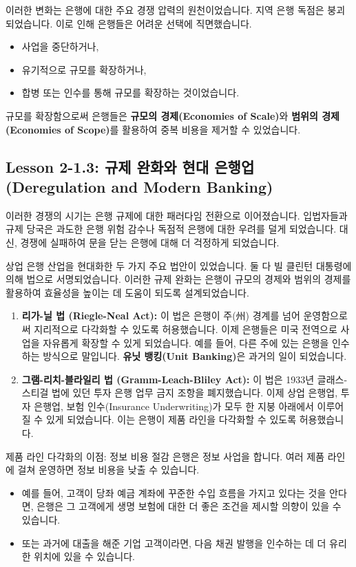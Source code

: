 \documentclass[11pt,a4paper]{article}
\begin{document}
이러한 변화는 은행에 대한 주요 경쟁 압력의 원천이었습니다. 지역 은행 독점은 붕괴되었습니다. 이로 인해 은행들은 어려운 선택에 직면했습니다.
\begin{itemize}
    \item 사업을 중단하거나,
    \item 유기적으로 규모를 확장하거나,
    \item 합병 또는 인수를 통해 규모를 확장하는 것이었습니다.
\end{itemize}
규모를 확장함으로써 은행들은 \textbf{규모의 경제(Economies of Scale)}와 \textbf{범위의 경제(Economies of Scope)}를 활용하여 중복 비용을 제거할 수 있었습니다.

\newpage
\subsection{Lesson 2-1.3: 규제 완화와 현대 은행업 (Deregulation and Modern Banking)}

이러한 경쟁의 시기는 은행 규제에 대한 패러다임 전환으로 이어졌습니다. 입법자들과 규제 당국은 과도한 은행 위험 감수나 독점적 은행에 대한 우려를 덜게 되었습니다. 대신, 경쟁에 실패하여 문을 닫는 은행에 대해 더 걱정하게 되었습니다.

상업 은행 산업을 현대화한 두 가지 주요 법안이 있었습니다. 둘 다 빌 클린턴 대통령에 의해 법으로 서명되었습니다. 이러한 규제 완화는 은행이 규모의 경제와 범위의 경제를 활용하여 효율성을 높이는 데 도움이 되도록 설계되었습니다.

\begin{enumerate}
    \item \textbf{리가-닐 법 (Riegle-Neal Act):}
    이 법은 은행이 주(州) 경계를 넘어 운영함으로써 지리적으로 다각화할 수 있도록 허용했습니다. 이제 은행들은 미국 전역으로 사업을 자유롭게 확장할 수 있게 되었습니다. 예를 들어, 다른 주에 있는 은행을 인수하는 방식으로 말입니다. \textbf{유닛 뱅킹(Unit Banking)}은 과거의 일이 되었습니다.

    \item \textbf{그램-리치-블라일리 법 (Gramm-Leach-Bliley Act):}
    이 법은 1933년 글래스-스티걸 법에 있던 투자 은행 업무 금지 조항을 폐지했습니다. 이제 상업 은행업, 투자 은행업, 보험 인수(Insurance Underwriting)가 모두 한 지붕 아래에서 이루어질 수 있게 되었습니다. 이는 은행이 제품 라인을 다각화할 수 있도록 허용했습니다.
\end{enumerate}

\begin{examplebox}{제품 라인 다각화의 이점: 정보 비용 절감}
은행은 정보 사업을 합니다. 여러 제품 라인에 걸쳐 운영하면 정보 비용을 낮출 수 있습니다.
\begin{itemize}
    \item 예를 들어, 고객이 당좌 예금 계좌에 꾸준한 수입 흐름을 가지고 있다는 것을 안다면, 은행은 그 고객에게 생명 보험에 대한 더 좋은 조건을 제시할 의향이 있을 수 있습니다.
    \item 또는 과거에 대출을 해준 기업 고객이라면, 다음 채권 발행을 인수하는 데 더 유리한 위치에 있을 수 있습니다.
\end{itemize}
\end{examplebox}
\end{document}
